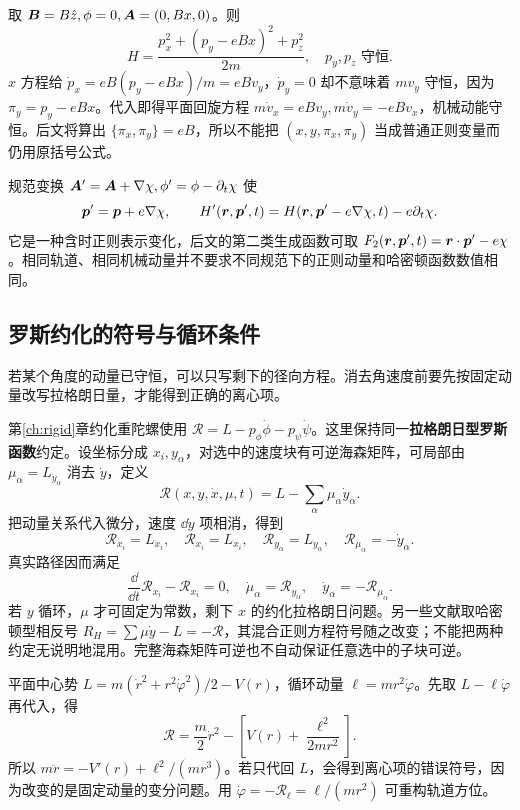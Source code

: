 \begin{example}
取 $\boldsymbol{B}=B\hat z,\phi=0,\boldsymbol{A}=(0,Bx,0)$。则
\[
H=\frac{p_x^2+(p_y-eBx)^2+p_z^2}{2m},\quad
p_y,p_z\text{ 守恒}.
\]
$x$ 方程给 $\dot p_x=eB(p_y-eBx)/m=eBv_y$，$\dot p_y=0$ 却不意味着 $mv_y$ 守恒，因为 $\pi_y=p_y-eBx$。代入即得平面回旋方程 $m\dot v_x=eBv_y,m\dot v_y=-eBv_x$，机械动能守恒。后文将算出 $\{\pi_x,\pi_y\}=eB$，所以不能把 $(x,y,\pi_x,\pi_y)$ 当成普通正则变量而仍用原括号公式。
\end{example}

规范变换 $\boldsymbol{A}'=\boldsymbol{A}+\nabla\chi,\phi'=\phi-\partial_t\chi$ 使
\[
\boldsymbol{p}'=\boldsymbol{p}+e\nabla\chi,\qquad
H'(\boldsymbol{r},\boldsymbol{p}',t)=H(\boldsymbol{r},\boldsymbol{p}'-e\nabla\chi,t)-e\partial_t\chi.
\]
它是一种含时正则表示变化，后文的第二类生成函数可取 $F_2(\boldsymbol{r},\boldsymbol{p}',t)=\boldsymbol{r}\cdot\boldsymbol{p}'-e\chi$。相同轨道、相同机械动量并不要求不同规范下的正则动量和哈密顿函数数值相同。

\subsection{罗斯约化的符号与循环条件}
若某个角度的动量已守恒，可以只写剩下的径向方程。消去角速度前要先按固定动量改写拉格朗日量，才能得到正确的离心项。

第\ref{ch:rigid}章约化重陀螺使用 $\mathcal R=L-p_\phi\dot\phi-p_\psi\dot\psi$。这里保持同一\textbf{拉格朗日型罗斯函数}约定。设坐标分成 $x_i,y_\alpha$，对选中的速度块有可逆海森矩阵，可局部由 $\mu_\alpha=L_{\dot y_\alpha}$ 消去 $\dot y$，定义
\begin{equation}
\mathcal R(x,y,\dot x,\mu,t)=L-\sum_\alpha\mu_\alpha\dot y_\alpha.
\label{eq:routhian}
\end{equation}
把动量关系代入微分，速度 $\dd\dot y$ 项相消，得到
\[
\mathcal R_{\dot x_i}=L_{\dot x_i},\quad \mathcal R_{x_i}=L_{x_i},\quad
\mathcal R_{y_\alpha}=L_{y_\alpha},\quad
\mathcal R_{\mu_\alpha}=-\dot y_\alpha.
\]
真实路径因而满足
\[
\frac{\dd}{\dd t}\mathcal R_{\dot x_i}-\mathcal R_{x_i}=0,\quad
\dot\mu_\alpha=\mathcal R_{y_\alpha},\quad
\dot y_\alpha=-\mathcal R_{\mu_\alpha}.
\]
若 $y$ 循环，$\mu$ 才可固定为常数，剩下 $x$ 的约化拉格朗日问题。另一些文献取哈密顿型相反号 $R_H=\sum\mu\dot y-L=-\mathcal R$，其混合正则方程符号随之改变；不能把两种约定无说明地混用。完整海森矩阵可逆也不自动保证任意选中的子块可逆。

\begin{example}[中心力约化为什么要加离心有效势？]
平面中心势 $L=m(\dot r^2+r^2\dot\varphi^2)/2-V(r)$，循环动量 $\ell=mr^2\dot\varphi$。先取 $L-\ell\dot\varphi$ 再代入，得
\[
\mathcal R=\frac m2\dot r^2-\left[V(r)+\frac{\ell^2}{2mr^2}\right].
\]
所以 $m\ddot r=-V'(r)+\ell^2/(mr^3)$。若只代回 $L$，会得到离心项的错误符号，因为改变的是固定动量的变分问题。用 $\dot\varphi=-\mathcal R_\ell=\ell/(mr^2)$ 可重构轨道方位。
\end{example}



